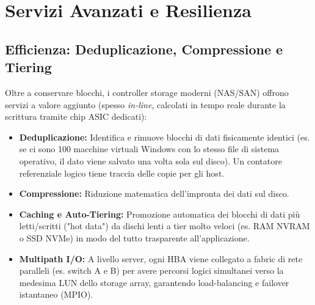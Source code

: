 \section{Servizi Avanzati e Resilienza}

\subsection{Efficienza: Deduplicazione, Compressione e Tiering}
Oltre a conservare blocchi, i controller storage moderni (NAS/SAN) offrono servizi a valore aggiunto (spesso \textit{in-line}, calcolati in tempo reale durante la scrittura tramite chip ASIC dedicati):
\begin{itemize}
    \item \textbf{Deduplicazione:} Identifica e rimuove blocchi di dati fisicamente identici (es. se ci sono 100 macchine virtuali Windows con lo stesso file di sistema operativo, il dato viene salvato una volta sola sul disco). Un contatore referenziale logico tiene traccia delle copie per gli host.
    \item \textbf{Compressione:} Riduzione matematica dell'impronta dei dati sul disco.
    \item \textbf{Caching e Auto-Tiering:} Promozione automatica dei blocchi di dati più letti/scritti ("hot data") da dischi lenti a tier molto veloci (es. RAM NVRAM o SSD NVMe) in modo del tutto trasparente all'applicazione.
    \item \textbf{Multipath I/O:} A livello server, ogni HBA viene collegato a fabric di rete paralleli (es. switch A e B) per avere percorsi logici simultanei verso la medesima LUN dello storage array, garantendo load-balancing e failover istantaneo (MPIO).
\end{itemize}


